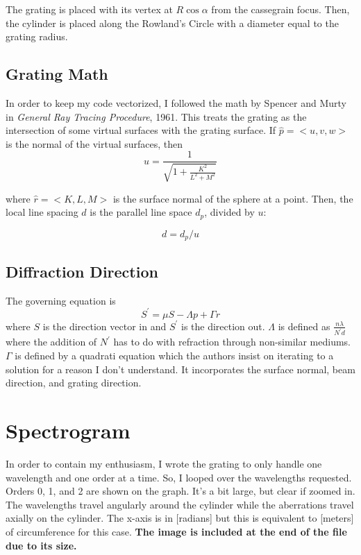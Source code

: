 \documentclass{article}
\begin{document}
The grating is placed with its vertex at $R\cos{\alpha}$ from the cassegrain focus. Then, the cylinder is placed along the Rowland's Circle with a diameter equal to the grating radius.

\subsection{Grating Math}
In order to keep my code vectorized, I followed the math by Spencer and Murty in \textit{General Ray Tracing Procedure}, 1961.  This treats the grating as the intersection of some virtual surfaces with the grating surface. If $\hat{p} = <u, v, w>$ is the normal of the virtual surfaces, then 
\begin{equation}
    u = \frac{1}{\sqrt{1 + \frac{K^2}{L^2 + M^2}}}
\end{equation}

where $\hat{r} = <K, L, M>$ is the surface normal of the sphere at a point. Then, the local line spacing $d$ is the parallel line space $d_p$, divided by $u$:

\begin{equation}
    \label{eq:local}
    d = d_p / u
\end{equation}

\subsection{Diffraction Direction}
The governing equation is
\begin{equation}
    \label{eq:fun}
    S^\prime = \mu S - \Lambda p + \Gamma r
\end{equation}
where $S$ is the direction vector in and $S^\prime$ is the direction out. $\Lambda$ is defined as $\frac{n\lambda}{N^\prime d}$ where the addition of $N^\prime$ has to do with refraction through non-similar mediums. $\Gamma$ is defined by a quadrati equation which the authors insist on iterating to a solution for a reason I don't understand. It incorporates the surface normal, beam direction, and grating direction.

\section{Spectrogram}
In order to contain my enthusiasm, I wrote the grating to only handle one wavelength and one order at a time. So, I looped over the wavelengths requested. Orders 0, 1, and 2 are shown on the graph. It's a bit large, but clear if zoomed in. The wavelengths travel angularly around the cylinder while the aberrations travel axially on the cylinder. The x-axis is in [radians] but this is equivalent to [meters] of circumference for this case. \bf{The image is included at the end of the file due to its size.}
\end{document}
